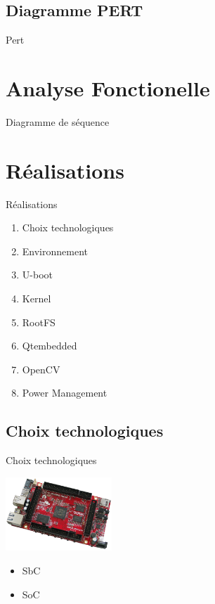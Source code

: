\documentclass[11pt]{beamer}
\begin{document}
	\subsection{Diagramme PERT}
	\begin{frame}{Pert}
		\begin{center}
			
		\end{center}
	\end{frame}
	
	\section{Analyse Fonctionelle}
	\begin{frame}{Diagramme de séquence}
	
	\end{frame}
	
	\section{Réalisations}
	
	\begin{frame}{Réalisations}
		
		\begin{enumerate}
			\item<+-|alert@+> Choix technologiques
			\item<+-|alert@+> Environnement
			\item<+-|alert@+> U-boot
			\item<+-|alert@+> Kernel
			\item<+-|alert@+> RootFS
			\item<+-|alert@+> Qtembedded
			\item<+-|alert@+> OpenCV
			\item<+-|alert@+> Power Management
		\end{enumerate}
		
	\end{frame}
	
	\subsection{Choix technologiques}
	\begin{frame}{Choix technologiques}
	\begin{center}
		  \includegraphics[width=4cm]{commons/A20-OLinuXino-MICRO-0.jpg}
		 \begin{itemize}
			\item SbC
			\item SoC
		\end{itemize}
	\end{center}
	\end{frame}
	
\end{document}
